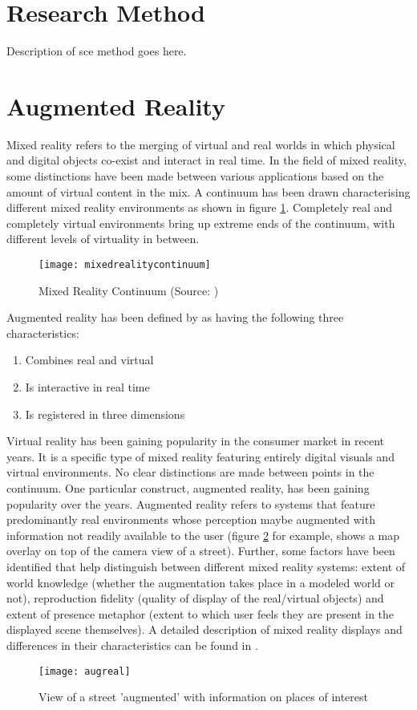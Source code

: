 \section{Research Method}
Description of sce method goes here.


\section{Augmented Reality}
\label{sec:augreal}
Mixed reality refers to the merging of virtual and real worlds in which physical and digital objects co-exist and interact in real time. In the field of mixed reality, some distinctions have been made between various applications based on the amount of virtual content in the mix. A continuum has been drawn characterising different mixed reality environments as shown in figure \ref{fig:mixedrealitycontinuum}. Completely real and completely virtual environments bring up extreme ends of the continuum, with different levels of virtuality in between. 

\begin{figure}
	\centering
	\texttt{[image: mixedrealitycontinuum]}
	\caption{Mixed Reality Continuum (Source: \cite{milgram1995augmented})}
	\label{fig:mixedrealitycontinuum}
\end{figure}

Augmented reality has been defined by \textcite{azuma1997survey} as having the following three characteristics: 

\begin{enumerate}
	\item Combines real and virtual 
	\item Is interactive in real time
	\item Is registered in three dimensions
\end{enumerate} 

Virtual reality has been gaining popularity in the consumer market in recent years. It is a specific type of mixed reality featuring entirely digital visuals and virtual environments. No clear distinctions are made between points in the continuum. One particular construct, augmented reality, has been gaining popularity over the years. Augmented reality refers to systems that feature predominantly real environments whose perception maybe augmented with information not readily available to the user (figure \ref{fig:augreal} for example, shows a map overlay on top of the camera view of a street). Further, some factors have been identified that help distinguish between different mixed reality systems: extent of world knowledge (whether the augmentation takes place in a modeled world or not), reproduction fidelity (quality of display of the real/virtual objects) and extent of presence metaphor (extent to which user feels they are present in the displayed scene themselves). A detailed description of mixed reality displays and differences in their characteristics can be found in \cite{milgram1995augmented}. 

\begin{figure}
	\centering
	\texttt{[image: augreal]}
	\caption{View of a street 'augmented' with information on places of interest}
	\label{fig:augreal}
\end{figure}
